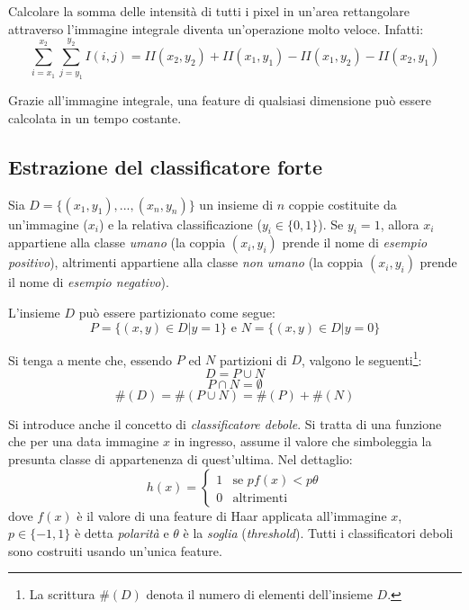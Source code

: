             Calcolare la somma delle intensità di tutti i pixel in un'area rettangolare attraverso l'immagine integrale diventa un'operazione molto veloce.
            Infatti: $$ \sum_{i = x_1}^{x_2} \sum_{j = y_1}^{y_2} I(i,j) =
            II(x_2, y_2) + II(x_1, y_1) - II(x_1, y_2) - II(x_2, y_1)$$

            Grazie all'immagine integrale, una feature di qualsiasi dimensione può essere calcolata in un tempo costante.


    \subsection{Estrazione del classificatore forte} %
    \label{sub:estrazione_del_classificatore_forte}
        Sia $D = \{(x_1, y_1), ..., (x_n, y_n)\}$ un insieme di $n$ coppie costituite da un'immagine ($x_i$) e la relativa classificazione ($y_i \in \{ 0, 1 \}$). Se $y_i = 1$, allora $x_i$ appartiene alla classe \emph{umano} (la coppia $(x_i, y_i)$ prende il nome di \emph{esempio positivo}), altrimenti appartiene alla classe \emph{non umano} (la coppia $(x_i, y_i)$ prende il nome di \emph{esempio negativo}).

        L'insieme $D$ può essere partizionato come segue:
        $$P = \{(x, y) \in D | y = 1\} \text{ e } N = \{(x,y) \in D | y = 0\}$$

        Si tenga a mente che, essendo $P$ ed $N$ partizioni di $D$, valgono le seguenti\footnote{La scrittura $\#(D)$ denota il numero di elementi dell'insieme $D$.}:
        \begin{equation}
            D = P \cup N
        \end{equation}
        \begin{equation}
            P \cap N = \emptyset
        \end{equation}
        \begin{equation}
            \#(D) = \#(P \cup N) = \#(P) + \#(N)
        \end{equation}

        Si introduce anche il concetto di \emph{classificatore debole}. Si tratta di una funzione che per una data immagine $x$ in ingresso, assume il valore che simboleggia la presunta classe di appartenenza di quest'ultima.
        Nel dettaglio:
        \begin{equation}
            h(x) = \begin{cases}
                1 & \text{se $pf(x) < p\theta$}\\
                0 & \text{altrimenti}
            \end{cases}
        \end{equation}
        dove $f(x)$ è il valore di una feature di Haar applicata all'immagine $x$, $p \in \{-1,1\}$ è detta \emph{polarità} e $\theta$ è la \emph{soglia} (\emph{threshold}). Tutti i classificatori deboli sono costruiti usando un'unica feature.

